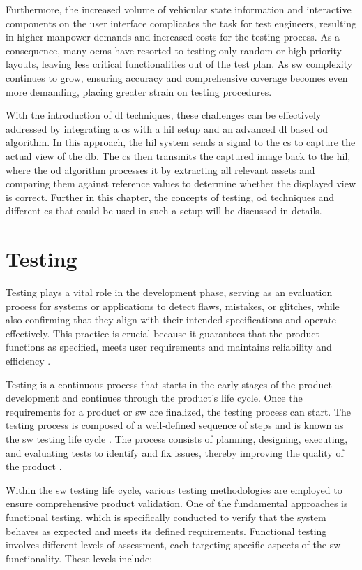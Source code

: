 Furthermore, the increased volume of vehicular state information and interactive components on the user interface complicates the task for test engineers, resulting in higher manpower demands and increased costs for the testing process. As a consequence, many \gls{oem}s have resorted to testing only random or high-priority layouts, leaving less critical functionalities out of the test plan. As \gls{sw} complexity continues to grow, ensuring accuracy and comprehensive coverage becomes even more demanding, placing greater strain on testing procedures.

With the introduction of \gls{dl} techniques, these challenges can be effectively addressed by integrating a \gls{cs} with a \gls{hil} setup and an advanced \gls{dl} based \gls{od} algorithm. In this approach, the \gls{hil}  system sends a signal to the \gls{cs} to capture the actual view of the \gls{db}. The \gls{cs} then transmits the captured image back to the \gls{hil}, where the \gls{od} algorithm processes it by extracting all relevant assets and comparing them against reference values to determine whether the displayed view is correct. Further in this chapter, the concepts of testing, \gls{od} techniques and different \gls{cs} that could be used in such a setup will be discussed in details.

\section{Testing}
Testing plays a vital role in the development phase, serving as an evaluation process for systems or applications to detect flaws, mistakes, or glitches, while also confirming that they align with their intended specifications and operate effectively. This practice is crucial because it guarantees that the product functions as specified, meets user requirements and maintains reliability and efficiency \cite{leloudas2023}.

Testing is a continuous process that starts in the early stages of the product development and continues through the product's life cycle. Once the requirements for a product or \gls{sw} are finalized, the testing process can start. The testing process is composed of a well-defined sequence of steps and is known as the \gls{sw} testing life cycle \cite{ML_SW_Testing}. The process consists of planning, designing, executing, and evaluating tests to identify and fix issues, thereby improving the quality of the product \cite{leloudas2023}.

Within the \gls{sw} testing life cycle, various testing methodologies are employed to ensure comprehensive product validation. One of the fundamental approaches is functional testing, which is specifically conducted to verify that the system behaves as expected and meets its defined requirements. Functional testing involves different levels of assessment, each targeting specific aspects of the \gls{sw} functionality. These levels include:

